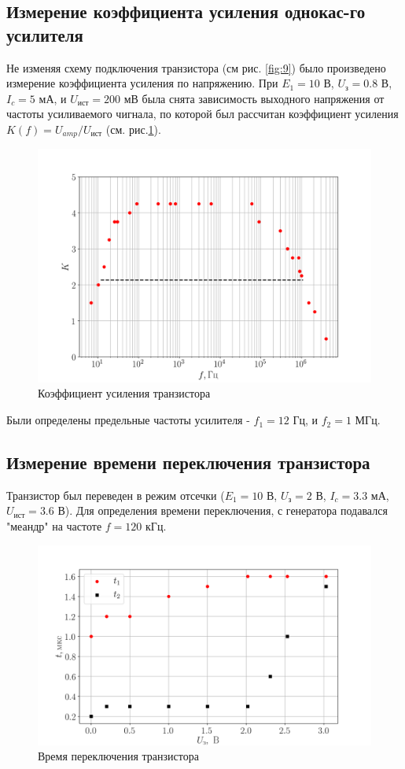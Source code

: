 \subsection{Измерение коэффициента усиления однокас-го усилителя}
Не изменяя схему подключения транзистора (см рис. \ref{fig:9}) было произведено измерение коэффициента усиления по напряжению.
При $E_1 = 10$ В, $U_{\text{з}} = 0.8$ В, $I_c = 5$ мА, и $U_{\text{ист}} = 200$ мВ была снята зависимость
выходного напряжения от частоты усиливаемого чигнала, по которой был рассчитан коэффициент усиления $K(f) =
U_{amp}/U_{\text{ист}}$ (см. рис.\ref{fig:11}).

\begin{figure}[h!]
	\centering
	\includegraphics[width=0.8\linewidth]{fig/task4.png}
	\caption{Коэффициент усиления транзистора}
	\label{fig:11}
\end{figure}
Были определены предельные частоты усилителя - $f_1 = 12$ Гц, и $f_2 = 1$ МГц.

\subsection{Измерение времени переключения транзистора}
Транзистор был переведен в режим отсечки ($E_1 = 10$ В, $U_{\text{з}} = 2$ В, $I_c = 3.3$ мА, $U_{\text{ист}} = 3.6$ В). Для
определения времени переключения, с генератора подавался "меандр" на частоте $f = 120$ кГц.

\begin{figure}[h!]
	\centering
	\includegraphics[width=0.8\linewidth]{fig/task6.png}
	\caption{Время переключения транзистора}
	\label{fig:12}
\end{figure}

